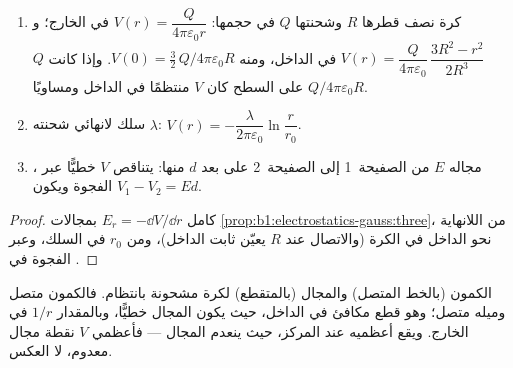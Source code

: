 \begin{proposition}\label{prop:b1:potential-capacitors:classic}
\begin{enumerate}
  \item كرة نصف قطرها $R$ وشحنتها $Q$ في حجمها: $V(r) = \dfrac{Q}{4\pi\varepsilon_0r}$
        في الخارج؛ و $V(r) = \dfrac{Q}{4\pi\varepsilon_0}\,\dfrac{3R^2 - r^2}{2R^3}$
        في الداخل، ومنه $V(0) = \tfrac32\,Q/4\pi\varepsilon_0R$. وإذا كانت $Q$ على السطح
        كان $V$ منتظمًا في الداخل ومساويًا $Q/4\pi\varepsilon_0R$.
  \item سلك لانهائي شحنته $\lambda$: $V(r) = -\dfrac{\lambda}{2\pi\varepsilon_0}\ln\dfrac{r}{r_0}$.
  \item {}، مجاله $E$ من الصفيحة~1 إلى الصفيحة~2 على بعد $d$
        منها: يتناقص $V$ خطيًّا عبر الفجوة ويكون $V_1 - V_2 = Ed$.
\end{enumerate}
\end{proposition}

\begin{proof}
كامل $E_r = -\dd V/\dd r$ بمجالات
\cref{prop:b1:electrostatics-gauss:three}، من اللانهاية نحو الداخل في
الكرة (والاتصال عند $R$ يعيّن ثابت الداخل)، ومن $r_0$ في
السلك، وعبر الفجوة في .
\end{proof}

\begin{omfigure}

{\small الكمون (بالخط المتصل) والمجال (بالمتقطع) لكرة مشحونة
بانتظام. فالكمون متصل وميله متصل؛ وهو
قطع مكافئ في الداخل، حيث يكون المجال خطيًّا، وبالمقدار $1/r$ في الخارج. ويقع
أعظميه عند المركز، حيث ينعدم المجال --- فأعظمي
$V$ نقطة مجال معدوم، لا العكس.}
\end{omfigure}

